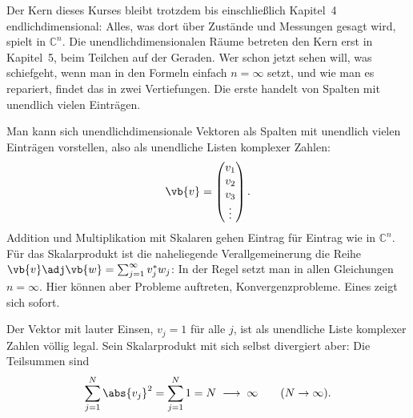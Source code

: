 Der Kern dieses Kurses bleibt trotzdem bis einschließlich Kapitel~4 endlichdimensional:
Alles, was dort über Zustände und Messungen gesagt wird, spielt in $\mathbb{C}^n$. Die
unendlichdimensionalen Räume betreten den Kern erst in Kapitel~5, beim Teilchen auf der
Geraden. Wer schon jetzt sehen will, was schiefgeht, wenn man in den Formeln einfach
$n = \infty$ setzt, und wie man es repariert, findet das in zwei Vertiefungen. Die erste
handelt von Spalten mit unendlich vielen Einträgen.

\begin{vertiefung}[id=c03.v1,
    titel={Spalten mit unendlich vielen Einträgen},
    wozu={Setzt man in den Formeln von Abschnitt~\ref{c03.s2} einfach $n = \infty$, so kann
      das Skalarprodukt divergieren. Hier wird gezeigt, wie man das repariert: Man lässt
      nur Vektoren zu, deren Skalarprodukt mit sich selbst endlich ist. Diese Vektoren
      bilden den Raum $\elltwo$.},
    voraussetzung={Abschnitt~\ref{c03.s2}; konvergente Reihen. Der Kern bis Kapitel~4
      braucht den Block nicht.},
    zurueck={Ein Vektor mit unendlich vielen Einträgen ist zugelassen, wenn die Summe der
      Betragsquadrate seiner Einträge endlich ist. Für solche Vektoren ist das
      Skalarprodukt als unendliche Summe erklärt und hat dieselben Rechenregeln wie in
      $\mathbb{C}^n$.}]
  Man kann sich unendlichdimensionale Vektoren als Spalten mit unendlich vielen Einträgen
  vorstellen, also als unendliche Listen komplexer Zahlen:
  \begin{equation*}
    \vb{v} = \begin{pmatrix} v_1 \\ v_2 \\ v_3 \\ \vdots \end{pmatrix} .
  \end{equation*}
  Addition und Multiplikation mit Skalaren gehen Eintrag für Eintrag wie in $\mathbb{C}^n$.
  Für das Skalarprodukt ist die naheliegende Verallgemeinerung die Reihe
  $\vb{v}\adj\vb{w} = \sum_{j=1}^{\infty} v_j^* w_j$: In der Regel setzt man in allen
  Gleichungen $n = \infty$. Hier können aber Probleme auftreten, Konvergenzprobleme. Eines
  zeigt sich sofort.

  \begin{example}\label{c03.ex.einsen}
    Der Vektor mit lauter Einsen, $v_j = 1$ für alle $j$, ist als unendliche Liste
    komplexer Zahlen völlig legal. Sein Skalarprodukt mit sich selbst divergiert aber: Die
    Teilsummen sind
    \begin{equation}\label{c03.eq.einsen}
      \sum_{j=1}^{N} \abs{v_j}^2 = \sum_{j=1}^{N} 1 = N \;\longrightarrow\; \infty
      \qquad (N \to \infty) .
    \end{equation}
  \end{example}


\end{vertiefung}
